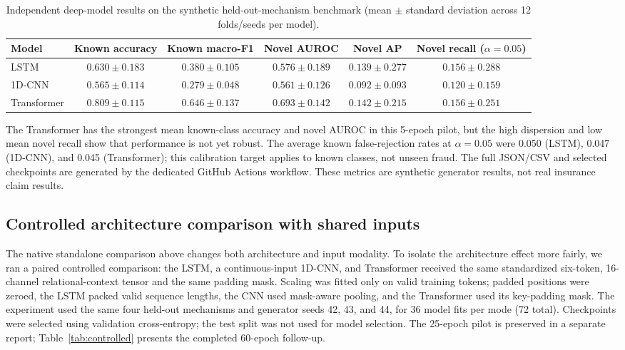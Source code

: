 \documentclass[conference]{IEEEtran}
\begin{document}
\begin{table}[t]
\caption{Independent deep-model results on the synthetic held-out-mechanism benchmark (mean $\pm$ standard deviation across 12 folds/seeds per model).}
\label{tab:deep}
\centering
\small
\begin{tabular}{lccccc}
\toprule
Model & Known accuracy & Known macro-F1 & Novel AUROC & Novel AP & Novel recall ($\alpha=0.05$)\\
\midrule
LSTM & $0.630\pm0.183$ & $0.380\pm0.105$ & $0.576\pm0.189$ & $0.139\pm0.277$ & $0.156\pm0.288$\\
1D-CNN & $0.565\pm0.114$ & $0.279\pm0.048$ & $0.561\pm0.126$ & $0.092\pm0.093$ & $0.120\pm0.159$\\
Transformer & $0.809\pm0.115$ & $0.646\pm0.137$ & $0.693\pm0.142$ & $0.142\pm0.215$ & $0.156\pm0.251$\\
\bottomrule
\end{tabular}
\end{table}

The Transformer has the strongest mean known-class accuracy and novel AUROC in this 5-epoch pilot, but the high dispersion and low mean novel recall show that performance is not yet robust. The average known false-rejection rates at $\alpha=0.05$ were 0.050 (LSTM), 0.047 (1D-CNN), and 0.045 (Transformer); this calibration target applies to known classes, not unseen fraud. The full JSON/CSV and selected checkpoints are generated by the dedicated GitHub Actions workflow. These metrics are synthetic generator results, not real insurance claim results.

\subsection{Controlled architecture comparison with shared inputs}
The native standalone comparison above changes both architecture and input modality. To isolate the architecture effect more fairly, we ran a paired controlled comparison: the LSTM, a continuous-input 1D-CNN, and Transformer received the same standardized six-token, 16-channel relational-context tensor and the same padding mask. Scaling was fitted only on valid training tokens; padded positions were zeroed, the LSTM packed valid sequence lengths, the CNN used mask-aware pooling, and the Transformer used its key-padding mask. The experiment used the same four held-out mechanisms and generator seeds 42, 43, and 44, for 36 model fits per mode (72 total). Checkpoints were selected using validation cross-entropy; the test split was not used for model selection. The 25-epoch pilot is preserved in a separate report; Table~\ref{tab:controlled} presents the completed 60-epoch follow-up.
\end{document}
